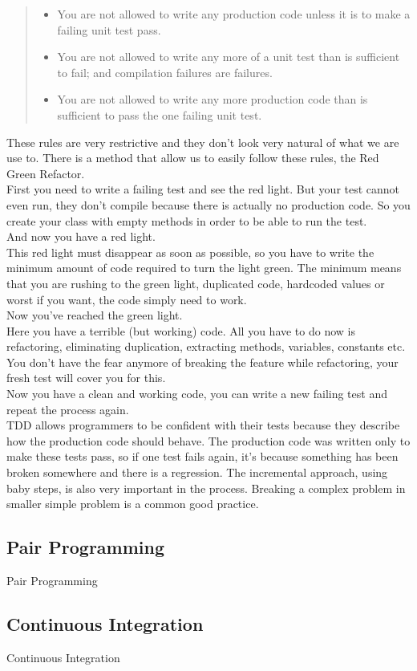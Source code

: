 \begin{quote}
\begin{itemize}
\item You are not allowed to write any production code unless it is to make
a failing unit test pass.
\item You are not allowed to write any more of a unit test than is sufficient
to fail;
and compilation failures are failures.
\item You are not allowed to write any more production code than is sufficient
to pass the one failing unit test.
\end{itemize}
\end{quote}

These rules are very restrictive and they don't look very natural of what we
are use to.
There is a method that allow us to easily follow these rules, the Red Green
Refactor. \\
\newline
First you need to write a failing test and see the red light.
But your test cannot even run, they don't compile because there is actually
no production code.
So you create your class with empty methods in order to be able to run the
test. \\
And now you have a red light. \\
\newline
This red light must disappear as soon as possible, so you have to write
the minimum amount of code required to turn the light green.
The minimum means that you are rushing to the green light, duplicated code,
hardcoded values or worst if you want, the code simply need to work. \\
Now you've reached the green light. \\
\newline
Here you have a terrible (but working) code.
All you have to do now is refactoring, eliminating duplication,
extracting methods, variables, constants etc.
You don't have the fear anymore of breaking the feature while refactoring,
your fresh test will cover you for this. \\
Now you have a clean and working code, you can write a new failing test and
repeat the process again. \\
\newline
TDD allows programmers to be confident with their tests because they
describe how the production code should behave.
The production code was written only to make these tests pass, so if one test
fails again, it's because something has been broken somewhere and there is a
regression.
The incremental approach, using baby steps, is also very important in
the process.
Breaking a complex problem in smaller simple problem is a common good
practice.

\subsection{Pair Programming}\label{subsec:pair-programming}
Pair Programming

\subsection{Continuous Integration}\label{subsec:continuous-integration}
Continuous Integration
